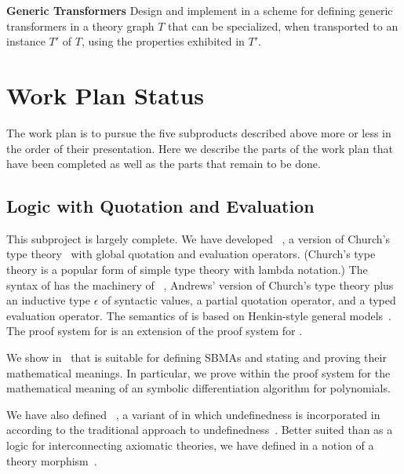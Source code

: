 \documentclass[fleqn]{llncs}
\begin{document}
\medskip

  \item[]\textbf{Generic Transformers} Design and implement in  a
    scheme for defining generic transformers in a theory graph $T$
    that can be specialized, when transported to an instance $T'$ of
    $T$, using the properties exhibited in $T'$.

\ei


\section{Work Plan Status}

The work plan is to pursue the five subproducts described above more or less in
the order of their presentation.  Here we describe the parts of the work
plan that have been completed as well as the parts that remain to be done.

\subsection*{Logic with Quotation and Evaluation}

This subproject is largely complete.  We have developed
{\churchqe}~\cite{Farmer18}, a version of Church's type
theory~\cite{Church40} with global quotation and evaluation operators.
(Church's type theory is a popular form of simple type theory with
lambda notation.)  The syntax of {\churchqe} has the machinery of
{\qzero}~\cite{Andrews02}, Andrews' version of Church's type theory
plus an inductive type $\epsilon$ of syntactic values, a partial
quotation operator, and a typed evaluation operator.  The semantics of
{\churchqe} is based on Henkin-style general models~\cite{Henkin50}.
The proof system for {\churchqe} is an extension of the proof system
for {\qzero}.

We show in~\cite{Farmer18} that {\churchqe} is suitable for defining
SBMAs and stating and proving their mathematical meanings.  In
particular, we prove within the proof system for {\churchqe} the
mathematical meaning of an symbolic differentiation algorithm for
polynomials.

We have also defined {\churchuqe}~\cite{Farmer17}, a variant of
{\churchqe} in which undefinedness is incorporated in {\churchqe}
according to the traditional approach to
undefinedness~\cite{Farmer04}.  Better suited than {\churchqe} as a
logic for interconnecting axiomatic theories, we have defined in
{\churchuqe} a notion of a theory morphism~\cite{Farmer17}.
\end{document}
